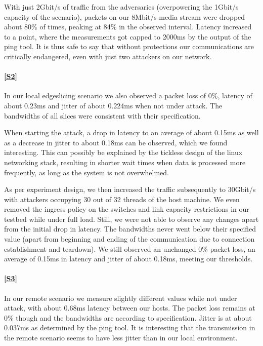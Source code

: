 \begin{description}[style=multiline, labelwidth=0.7cm]
    With just 2Gbit/s of traffic from the adversaries (overpowering the 1Gbit/s capacity of the scenario), packets on our 8Mbit/s media stream were dropped about 80\% of times, peaking at 84\% in the observed interval. Latency increased to a point, where the measurements got capped to 2000ms by the output of the ping tool. It is thus safe to say that without protections our communications are critically endangered, even with just two attackers on our network.

    \paragraph{\ref{S2}} In our local edgeslicing scenario we also observed a packet loss of 0\%, latency of about 0.23ms  and jitter of about 0.224ms when not under attack. The bandwidths of all slices were consistent with their specification.

    When starting the attack, a drop in latency to an average of about 0.15ms as well as a decrease in jitter to about 0.18ms can be observed, which we found interesting. This can possibly be explained by the tickless design of the linux networking stack, resulting in shorter wait times when data is processed more frequently, as long as the system is not overwhelmed.

    As per experiment design, we then increased the traffic subsequently to 30Gbit/s with attackers occupying 30 out of 32 threads of the host machine. We even removed the ingress policy on the switches and link capacity restrictions in our testbed while under full load. Still, we were not able to observe any changes apart from the initial drop in latency.
    The bandwidths never went below their specified value (apart from beginning and ending of the communication due to connection establishment and teardown). We still observed an unchanged 0\% packet loss, an average of 0.15ms in latency and jitter of about 0.18ms, meeting our thresholds.

    \paragraph{\ref{S3}} In our remote scenario we measure slightly different values while not under attack, with about 0.68ms latency between our hosts. The packet loss remains at 0\% though and the bandwidths are according to specification. Jitter is at about 0.037ms as determined by the ping tool. It is interesting that the transmission in the remote scenario seems to have less jitter than in our local environment.


\end{description}
